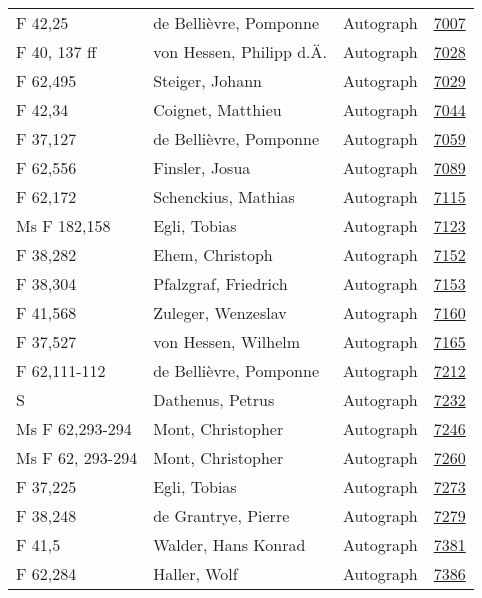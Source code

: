 \documentclass[10pt,a4paper,landscape]{report}
\begin{document}
\begin{longtable}{p{16cm}p{4cm}lr}
F 42,25	&	de Bellièvre, Pomponne	&	Autograph	&	\href{http://130.60.24.72/assignment/7007}{7007}\\
F 40, 137 ff	&	von Hessen, Philipp d.Ä.	&	Autograph	&	\href{http://130.60.24.72/assignment/7028}{7028}\\
F 62,495	&	Steiger, Johann	&	Autograph	&	\href{http://130.60.24.72/assignment/7029}{7029}\\
F 42,34	&	Coignet, Matthieu	&	Autograph	&	\href{http://130.60.24.72/assignment/7044}{7044}\\
F 37,127	&	de Bellièvre, Pomponne	&	Autograph	&	\href{http://130.60.24.72/assignment/7059}{7059}\\
F 62,556	&	Finsler, Josua	&	Autograph	&	\href{http://130.60.24.72/assignment/7089}{7089}\\
F 62,172	&	Schenckius, Mathias	&	Autograph	&	\href{http://130.60.24.72/assignment/7115}{7115}\\
Ms F 182,158	&	Egli, Tobias	&	Autograph	&	\href{http://130.60.24.72/assignment/7123}{7123}\\
F 38,282	&	Ehem, Christoph	&	Autograph	&	\href{http://130.60.24.72/assignment/7152}{7152}\\
F 38,304	&	Pfalzgraf, Friedrich	&	Autograph	&	\href{http://130.60.24.72/assignment/7153}{7153}\\
F 41,568	&	Zuleger, Wenzeslav	&	Autograph	&	\href{http://130.60.24.72/assignment/7160}{7160}\\
F 37,527	&	von Hessen, Wilhelm	&	Autograph	&	\href{http://130.60.24.72/assignment/7165}{7165}\\
F 62,111-112	&	de Bellièvre, Pomponne	&	Autograph	&	\href{http://130.60.24.72/assignment/7212}{7212}\\
S	&	Dathenus, Petrus	&	Autograph	&	\href{http://130.60.24.72/assignment/7232}{7232}\\
Ms F 62,293-294	&	Mont, Christopher	&	Autograph	&	\href{http://130.60.24.72/assignment/7246}{7246}\\
Ms F 62, 293-294	&	Mont, Christopher	&	Autograph	&	\href{http://130.60.24.72/assignment/7260}{7260}\\
F 37,225	&	Egli, Tobias	&	Autograph	&	\href{http://130.60.24.72/assignment/7273}{7273}\\
F 38,248	&	de Grantrye, Pierre	&	Autograph	&	\href{http://130.60.24.72/assignment/7279}{7279}\\
F 41,5	&	Walder, Hans Konrad	&	Autograph	&	\href{http://130.60.24.72/assignment/7381}{7381}\\
F 62,284	&	Haller, Wolf	&	Autograph	&	\href{http://130.60.24.72/assignment/7386}{7386}\\

\end{longtable}
\end{document}
